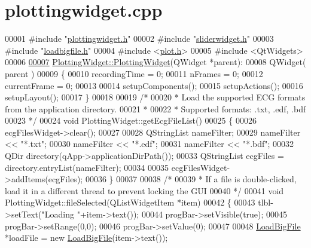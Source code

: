 \hypertarget{plottingwidget_8cpp_source}{}\section{plottingwidget.\+cpp}
\label{plottingwidget_8cpp_source}

\begin{DoxyCode}
00001 \textcolor{preprocessor}{#include "\hyperlink{plottingwidget_8h}{plottingwidget.h}"}
00002 \textcolor{preprocessor}{#include "\hyperlink{sliderwidget_8h}{sliderwidget.h}"}
00003 \textcolor{preprocessor}{#include "\hyperlink{loadbigfile_8h}{loadbigfile.h}"}
00004 \textcolor{preprocessor}{#include <\hyperlink{plot_8h}{plot.h}>}
00005 \textcolor{preprocessor}{#include <QtWidgets>}
00006 
\hypertarget{plottingwidget_8cpp_source.tex_l00007}{}\hyperlink{classPlottingWidget_a094b0449651206a5d5fbad95489d9a05}{00007} \hyperlink{classPlottingWidget_a094b0449651206a5d5fbad95489d9a05}{PlottingWidget::PlottingWidget}(QWidget *parent):
00008     QWidget( parent )
00009 \{
00010     recordingTime = 0;
00011     nFrames = 0;
00012     currentFrame = 0;
00013 
00014     setupComponents();
00015     setupActions();
00016     setupLayout();
00017 \}
00018 
00019 \textcolor{comment}{/*}
00020 \textcolor{comment}{ * Load the supported ECG formats from the application directory.}
00021 \textcolor{comment}{ *}
00022 \textcolor{comment}{ * Supported formats: .txt, .edf, .bdf}
00023 \textcolor{comment}{ */}
00024 \textcolor{keywordtype}{void} PlottingWidget::getEcgFileList()
00025 \{
00026     ecgFilesWidget->clear();
00027 
00028     QStringList nameFilter;
00029     nameFilter << \textcolor{stringliteral}{"*.txt"};
00030     nameFilter << \textcolor{stringliteral}{"*.edf"};
00031     nameFilter << \textcolor{stringliteral}{"*.bdf"};
00032     QDir directory(qApp->applicationDirPath());
00033     QStringList ecgFiles = directory.entryList(nameFilter);
00034 
00035     ecgFilesWidget->addItems(ecgFiles);
00036 \}
00037 
00038 \textcolor{comment}{/*}
00039 \textcolor{comment}{ * If a file is double-clicked, load it in a different thread to prevent locking the GUI}
00040 \textcolor{comment}{ */}
00041 \textcolor{keywordtype}{void} PlottingWidget::fileSelected(QListWidgetItem *item)
00042 \{
00043     tlbl->setText(\textcolor{stringliteral}{"Loading "}+item->text());
00044     progBar->setVisible(\textcolor{keyword}{true});
00045     progBar->setRange(0,0);
00046     progBar->setValue(0);
00047 
00048     \hyperlink{classLoadBigFile}{LoadBigFile} *loadFile = \textcolor{keyword}{new} \hyperlink{classLoadBigFile}{LoadBigFile}(item->text());

\end{DoxyCode}
